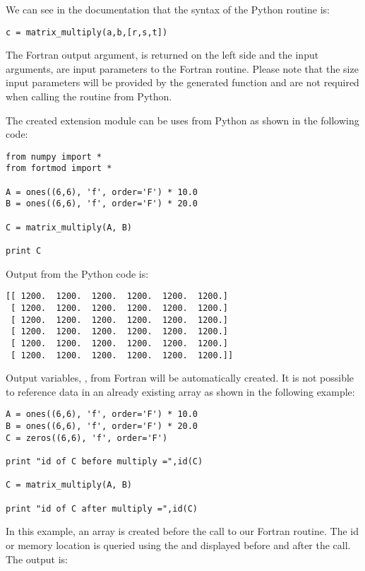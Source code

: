 \pymode

We can see in the documentation that the syntax of the Python routine is:

\begin{lstlisting}
c = matrix_multiply(a,b,[r,s,t])
\end{lstlisting}

The Fortran output argument,  is returned on the left side and the input arguments,  are input parameters to the Fortran routine. Please note that the size input parameters will be provided by the generated function and are not required when calling the routine from Python.

The created extension module can be uses from Python as shown in the following code:

\begin{lstlisting}
from numpy import *
from fortmod import *

A = ones((6,6), 'f', order='F') * 10.0
B = ones((6,6), 'f', order='F') * 20.0

C = matrix_multiply(A, B)

print C
\end{lstlisting}

Output from the Python code is:

\cmdmode

\begin{lstlisting}
[[ 1200.  1200.  1200.  1200.  1200.  1200.]
 [ 1200.  1200.  1200.  1200.  1200.  1200.]
 [ 1200.  1200.  1200.  1200.  1200.  1200.]
 [ 1200.  1200.  1200.  1200.  1200.  1200.]
 [ 1200.  1200.  1200.  1200.  1200.  1200.]
 [ 1200.  1200.  1200.  1200.  1200.  1200.]]
\end{lstlisting}

Output variables, , from Fortran will be automatically created. It is not possible to reference data in an already existing  array as shown in the following example:

\pymode

\begin{lstlisting}
A = ones((6,6), 'f', order='F') * 10.0
B = ones((6,6), 'f', order='F') * 20.0
C = zeros((6,6), 'f', order='F')

print "id of C before multiply =",id(C)

C = matrix_multiply(A, B)

print "id of C after multiply =",id(C)
\end{lstlisting}

In this example, an array  is created before the call to our Fortran routine. The id or memory location is queried using the  and displayed before and after the call. The output is:

